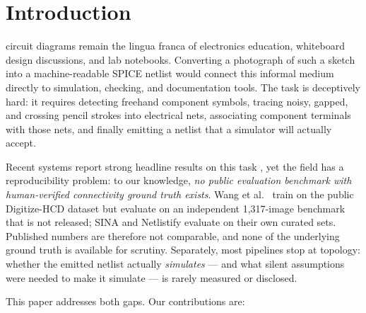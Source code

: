 \section{Introduction}
\label{sec:introduction}


 circuit diagrams remain the lingua franca
of electronics education, whiteboard design discussions, and lab
notebooks. Converting a photograph of such a sketch into a
machine-readable SPICE netlist would connect this informal medium
directly to simulation, checking, and documentation tools. The task is
deceptively hard: it requires detecting freehand component symbols,
tracing noisy, gapped, and crossing pencil strokes into electrical
nets, associating component terminals with those nets, and finally
emitting a netlist that a simulator will actually accept.

Recent systems report strong headline results on this task
\cite{wang2026topology,sina2026,reddy2022handdrawn}, yet the field has
a reproducibility problem: to our knowledge, \emph{no public
evaluation benchmark with human-verified connectivity ground truth
exists}. Wang et al.\ \cite{wang2026topology} train on the public
Digitize-HCD dataset \cite{digitizehcd_data} but evaluate on an
independent 1{,}317-image benchmark that is not released; SINA
\cite{sina2026} and Netlistify \cite{netlistify} evaluate on their own
curated sets. Published numbers are therefore not comparable, and none
of the underlying ground truth is available for scrutiny. Separately,
most pipelines stop at topology: whether the emitted netlist actually
\emph{simulates} — and what silent assumptions were needed to make it
simulate — is rarely measured or disclosed.

This paper addresses both gaps. Our contributions are:


